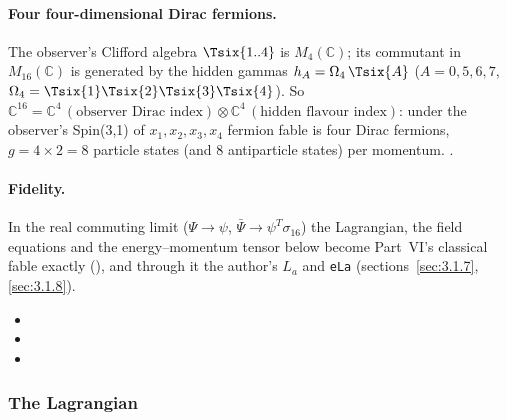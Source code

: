 \paragraph{Four four-dimensional Dirac fermions.} The observer's Clifford algebra $\Tsix{1..4}$ is
$M_4(\mathbb C)$; its commutant in $M_{16}(\mathbb C)$ is generated by the hidden gammas
$h_A=\Omega_4\,\Tsix{A}$ ($A=0,5,6,7$, $\Omega_4=\Tsix{1}\Tsix{2}\Tsix{3}\Tsix{4}$). So
$\mathbb C^{16}=\mathbb C^4\,(\text{observer Dirac index})\otimes\mathbb C^4\,(\text{hidden flavour index})$:
under the observer's Spin(3,1) of $x_1,x_2,x_3,x_4$ fermion fable is four Dirac fermions,
$g=4\times2=8$ particle states (and 8 antiparticle states) per momentum. 
.

\paragraph{Fidelity.} In the real commuting limit ($\Psi\to\psi$, $\bar\Psi\to\psi^{T}\sigma_{16}$) the
Lagrangian, the field equations and the energy--momentum tensor below become Part~VI's classical fable
exactly (), and through it the author's $L_a$ and \texttt{eLa} (sections~\ref{sec:3.1.7},
\ref{sec:3.1.8}). 
\begin{itemize}
  \item {}
  \item {}
  \item {}
\end{itemize}

\subsubsection{The Lagrangian}
\label{sec:4.1.2}


